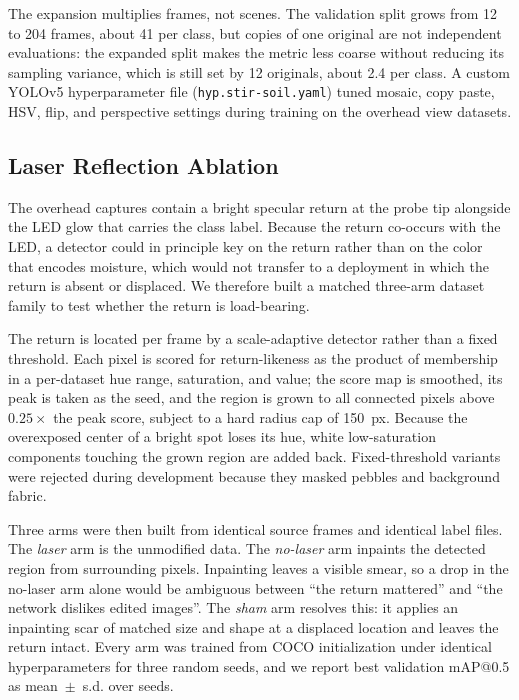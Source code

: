 ﻿\documentclass[journal]{IEEEtran}
\begin{document}
The expansion multiplies frames, not scenes. The validation split grows from 12 to 204 frames, about 41 per class, but copies of one original are not independent evaluations: the expanded split makes the metric less coarse without reducing its sampling variance, which is still set by 12 originals, about 2.4 per class. A custom YOLOv5 hyperparameter file (\texttt{hyp.stir-soil.yaml}) tuned mosaic, copy paste, HSV, flip, and perspective settings during training on the overhead view datasets.

\subsection{Laser Reflection Ablation}
\label{sec:ablation-method}
The overhead captures contain a bright specular return at the probe tip alongside the LED glow that carries the class label. Because the return co-occurs with the LED, a detector could in principle key on the return rather than on the color that encodes moisture, which would not transfer to a deployment in which the return is absent or displaced. We therefore built a matched three-arm dataset family to test whether the return is load-bearing.

The return is located per frame by a scale-adaptive detector rather than a fixed threshold. Each pixel is scored for return-likeness as the product of membership in a per-dataset hue range, saturation, and value; the score map is smoothed, its peak is taken as the seed, and the region is grown to all connected pixels above $0.25\times$ the peak score, subject to a hard radius cap of 150~px. Because the overexposed center of a bright spot loses its hue, white low-saturation components touching the grown region are added back. Fixed-threshold variants were rejected during development because they masked pebbles and background fabric.

Three arms were then built from identical source frames and identical label files. The \emph{laser} arm is the unmodified data. The \emph{no-laser} arm inpaints the detected region from surrounding pixels. Inpainting leaves a visible smear, so a drop in the no-laser arm alone would be ambiguous between ``the return mattered'' and ``the network dislikes edited images''. The \emph{sham} arm resolves this: it applies an inpainting scar of matched size and shape at a displaced location and leaves the return intact. Every arm was trained from COCO initialization under identical hyperparameters for three random seeds, and we report best validation mAP@0.5 as mean~$\pm$~s.d. over seeds.
\end{document}
